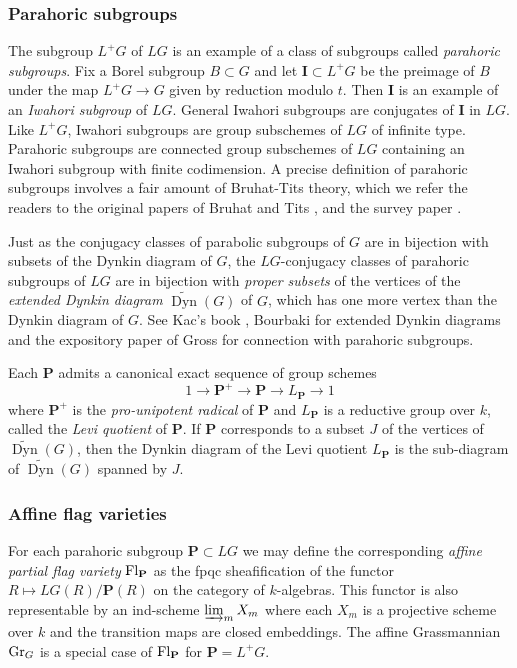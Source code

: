 \documentclass[]{pcmi}
\let\oldsubsubsection\subsubsection
\renewcommand{\subsubsection}[1]{%
\setcounter{subsubsection}{\value{equation}}%
\oldsubsubsection{#1}%
\refstepcounter{equation}%
}
\theoremstyle{plain}
\theoremstyle{definition}
\def\bI{\mathbf{I}}
\def\bP{\mathbf{P}}
\DeclareMathOperator\Dyn{Dyn}
\newcommand{\Fl}{\textup{Fl}}
\newcommand{\Gr}{\textup{Gr}}
\newcommand{\wt}{\widetilde}
\begin{document}
\subsubsection{Parahoric subgroups} The subgroup $L^{+}G$ of $LG$ is an example of a class of subgroups called {\em parahoric subgroups}.  Fix a Borel subgroup $B\subset G$ and let $\bI\subset L^{+}G$ be the preimage of $B$ under the map $L^{+}G\to G$ given by reduction modulo $t$. Then $\bI$ is an example of an {\em Iwahori subgroup} of $LG$. General Iwahori subgroups are conjugates of $\bI$ in $LG$. Like $L^{+}G$, Iwahori subgroups are group subschemes of $LG$ of infinite type. Parahoric subgroups are connected group subschemes of $LG$ containing an Iwahori subgroup with finite codimension. A precise definition of parahoric subgroups involves a fair amount of Bruhat-Tits theory, which we refer the readers to the original papers of Bruhat and Tits \cite{BT1}, and the survey paper \cite{Tits}. 

Just as the conjugacy classes of parabolic subgroups of $G$ are in bijection with subsets of the Dynkin diagram of $G$, the $LG$-conjugacy classes of parahoric subgroups of $LG$ are in bijection with {\em proper subsets} of the vertices of the {\em extended Dynkin diagram} $\wt{\Dyn}(G)$ of $G$, which has one more vertex than the Dynkin diagram of $G$. See Kac's book \cite[\S4.8]{Kac}, Bourbaki \cite[Ch VI]{Bourbaki} for extended Dynkin diagrams and the expository paper of Gross \cite{Gross} for connection with parahoric subgroups. 

Each $\bP$ admits a canonical exact sequence of group schemes
\begin{equation*}
1\to \bP^{+}\to \bP\to L_{\bP}\to1
\end{equation*}
where $\bP^{+}$ is the {\em pro-unipotent radical} of $\bP$ and $L_{\bP}$ is a reductive group over $k$, called the {\em Levi quotient} of $\bP$. If $\bP$ corresponds to a subset $J$ of the vertices of $\wt{\Dyn}(G)$, then the Dynkin diagram of the Levi quotient $L_{\bP}$ is the sub-diagram of $\wt{\Dyn}(G)$ spanned by $J$.





\subsubsection{Affine flag varieties} For each parahoric subgroup $\bP\subset LG$ we may define the corresponding {\em affine partial flag variety} $\Fl_{\bP}$ as the fpqc sheafification of the functor $R\mapsto LG(R)/\bP(R)$ on the category of $k$-algebras. This functor is also representable by an ind-scheme $\varinjlim_{m}X_{m}$ where each $X_{m}$ is a projective scheme over $k$ and the transition maps are closed embeddings.  The affine Grassmannian $\Gr_{G}$ is a special case of $\Fl_{\bP}$ for $\bP=L^{+}G$.
\end{document}
